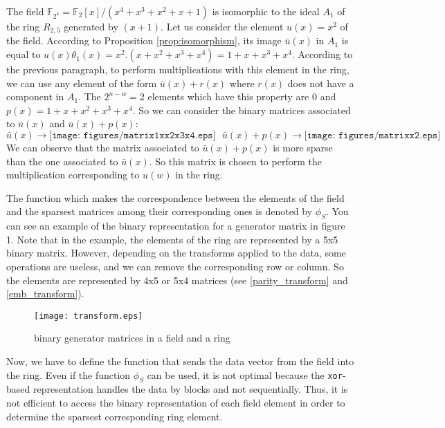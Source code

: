 \documentclass[conference]{IEEEtran}
\begin{document}
	The field $\mathbb{F}_{2^4}=\mathbb{F}_{2}[x]/(x^4+x^3+x^2+x+1)$ is isomorphic to the ideal $A_1$ of the ring $R_{2,5}$ generated by $(x+1)$. Let us consider the element $u(x)=x^2$ of the field. According to Proposition \ref{prop:isomorphism}, its image $\bar{u}(x)$ in $A_1$ is equal to $u(x)\theta_1(x)=x^2.(x+x^2+x^3+x^4)=1+x+x^3+x^4$.
	According to the previous paragraph, to perform multiplications with this element in the ring, we can use any element of the form $\bar{u}(x)+r(x)$ where $r(x)$ does not have a component in $A_1$. The $2^{n-w}=2$ elements which have this property are $0$ and $p(x)=1+x+x^2+x^3+x^4$. So we can consider the binary matrices associated to $\bar{u}(x)$ and $\bar{u}(x)+p(x)$:
	\begin{displaymath}
	\bar{u}(x) \longrightarrow \texttt{[image: figures/matrix1xx2x3x4.eps]} \ \ \   		
	\bar{u}(x)+p(x) \longrightarrow \texttt{[image: figures/matrixx2.eps]}   
	\end{displaymath}
	We can observe that the matrix associated to  $\bar{u}(x)+p(x)$ is more sparse than the one associated to $\bar{u}(x)$. So this matrix is chosen to perform the multiplication corresponding to $u(w)$ in the ring.

The function which makes the correspondence between the elements of the field and the sparsest matrices among their corresponding ones is denoted by $\phi_S$. You can see an example of the binary representation for a generator matrix in figure 1. Note that in the example, the elements of the ring are represented by a 5x5 binary matrix. However, depending on the transforms applied to the data, some operations are useless, and we can remove the corresponding row or column. So the elements are represented by 4x5 or 5x4 matrices (see \ref{parity_transform} and \ref{emb_transform}).

\begin{figure}
\label{fig:gen_mat}
\begin{center}
\texttt{[image: transform.eps]}
\end{center}
\caption{binary generator matrices in a field and a ring}
\end{figure}

Now, we have to define the function that sends the data vector from the field into the ring. Even if the function  $\phi_S$ can be used, it is not optimal because the \texttt{xor}-based representation handles the data by blocks and not sequentially. Thus, it is not efficient to access the binary representation of each field element in order to determine the sparsest corresponding ring element. 
\end{document}
